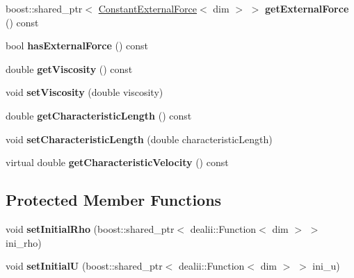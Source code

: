 \begin{DoxyCompactItemize}
\item 
\hypertarget{classnatrium_1_1ProblemDescription_a9989950e9e18966c6600ab4fd80b5009}{
boost::shared\_\-ptr$<$ \hyperlink{classnatrium_1_1ConstantExternalForce}{ConstantExternalForce}$<$ dim $>$ $>$ {\bfseries getExternalForce} () const }
\label{classnatrium_1_1ProblemDescription_a9989950e9e18966c6600ab4fd80b5009}

\item 
\hypertarget{classnatrium_1_1ProblemDescription_a5527b8c5da6a4decb34bf34cd02a6734}{
bool {\bfseries hasExternalForce} () const }
\label{classnatrium_1_1ProblemDescription_a5527b8c5da6a4decb34bf34cd02a6734}

\item 
\hypertarget{classnatrium_1_1ProblemDescription_a582ecf296837d78a8a00fd598de38de2}{
double {\bfseries getViscosity} () const }
\label{classnatrium_1_1ProblemDescription_a582ecf296837d78a8a00fd598de38de2}

\item 
\hypertarget{classnatrium_1_1ProblemDescription_ad624cab941ab79af0422e5f7c735e8d8}{
void {\bfseries setViscosity} (double viscosity)}
\label{classnatrium_1_1ProblemDescription_ad624cab941ab79af0422e5f7c735e8d8}

\item 
\hypertarget{classnatrium_1_1ProblemDescription_ac424dbc36ad2d61d128f3656a8d6952d}{
double {\bfseries getCharacteristicLength} () const }
\label{classnatrium_1_1ProblemDescription_ac424dbc36ad2d61d128f3656a8d6952d}

\item 
\hypertarget{classnatrium_1_1ProblemDescription_adc48f96c34c6318d911bbc41582c202b}{
void {\bfseries setCharacteristicLength} (double characteristicLength)}
\label{classnatrium_1_1ProblemDescription_adc48f96c34c6318d911bbc41582c202b}

\item 
\hypertarget{classnatrium_1_1ProblemDescription_a3af2ccea3bfbb7d1aa39570579fcf937}{
virtual double {\bfseries getCharacteristicVelocity} () const }
\label{classnatrium_1_1ProblemDescription_a3af2ccea3bfbb7d1aa39570579fcf937}

\end{DoxyCompactItemize}
\subsection*{Protected Member Functions}
\begin{DoxyCompactItemize}
\item 
\hypertarget{classnatrium_1_1ProblemDescription_a3b1f71cc4ec46691a29478049d851c8d}{
void {\bfseries setInitialRho} (boost::shared\_\-ptr$<$ dealii::Function$<$ dim $>$ $>$ ini\_\-rho)}
\label{classnatrium_1_1ProblemDescription_a3b1f71cc4ec46691a29478049d851c8d}

\item 
\hypertarget{classnatrium_1_1ProblemDescription_a1e173a98aaf7233b9b9e849b5d1f9efb}{
void {\bfseries setInitialU} (boost::shared\_\-ptr$<$ dealii::Function$<$ dim $>$ $>$ ini\_\-u)}
\label{classnatrium_1_1ProblemDescription_a1e173a98aaf7233b9b9e849b5d1f9efb}

\end{DoxyCompactItemize}


